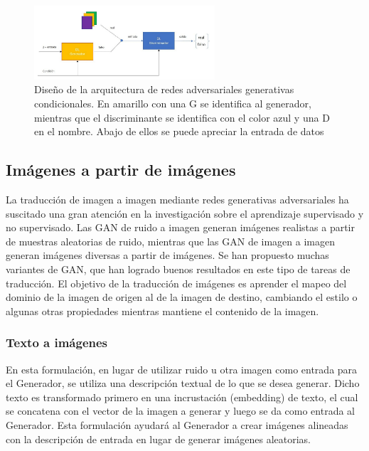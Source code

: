 \begin{figure}[ht!]
    \centering
    \includegraphics[width=0.6\textwidth]{Graphics/cgan-design.png}
    \caption{Diseño de la arquitectura de redes adversariales generativas condicionales. En amarillo con una G se identifica al generador, mientras que el discriminante se identifica con el color azul y una D en el nombre. Abajo de ellos se puede apreciar la entrada de datos}
    \label{fig:cgan-design}
\end{figure}

\subsection{Imágenes a partir de imágenes}
La traducción de imagen a imagen mediante redes generativas adversariales ha suscitado una gran atención en la investigación sobre el aprendizaje supervisado y no supervisado. Las GAN de ruido a imagen generan imágenes realistas a partir de muestras aleatorias de ruido, mientras que las GAN de imagen a imagen generan imágenes diversas a partir de imágenes. Se han propuesto muchas variantes de GAN, que han logrado buenos resultados en este tipo de tareas de traducción.
El objetivo de la traducción de imágenes es aprender el mapeo del dominio de la imagen de origen al de la imagen de destino, cambiando el estilo o algunas otras propiedades mientras mantiene el contenido de la imagen.
\subsubsection{Texto a imágenes}
En esta formulación, en lugar de utilizar ruido u otra imagen como entrada para el Generador, se utiliza una descripción textual de lo que se desea generar. Dicho texto es transformado primero en una incrustación (embedding) de texto, el cual se concatena con el vector de la imagen a generar y luego se da como entrada al Generador.  Esta formulación ayudará al Generador a crear imágenes alineadas con la descripción de entrada en lugar de generar imágenes aleatorias.

